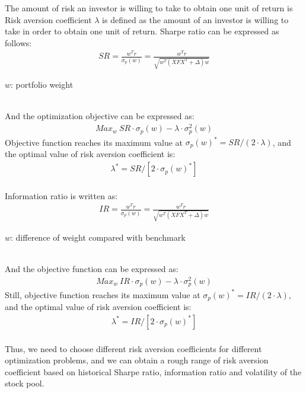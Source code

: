 \documentclass[10pt]{article}
\begin{document}
The amount of risk an investor is willing to take to obtain one unit of return is Risk aversion coefficient $\lambda$ is defined as the amount of an investor is willing to take in order to obtain one unit of return. Sharpe ratio can be expressed as follows:
~\\
\begin{equation}
\begin{split}
    SR=\frac{w^Tr}{\sigma_p(w)} =\frac{w^Tr}{\sqrt{w^T(XFX^T+\Delta)w}}
\end{split}
\end{equation}
\centerline{$w$: portfolio weight}
~\\
And the optimization objective can be expressed as:
\begin{equation}
\begin{split}
    Max_w\ SR\cdot \sigma_p(w)-\lambda\cdot\sigma^2_p(w)
\end{split}
\end{equation}
Objective function reaches its maximum value at $\sigma_p(w)^*=SR/(2\cdot\lambda)$, and the optimal value of risk aversion coefficient is:
~\\
\begin{equation}
\begin{split}
    \lambda^*=SR/[2\cdot\sigma_p(w)^*]
\end{split}
\end{equation}
~\\
Information ratio is written as:
~\\
\begin{equation}
\begin{split}
    IR=\frac{w^Tr}{\sigma_p(w)} =\frac{w^Tr}{\sqrt{w^T(XFX^T+\Delta)w}}
\end{split}
\end{equation}
\centerline{$w$: difference of weight compared with benchmark}
~\\
And the objective function can be expressed as:
\begin{equation}
\begin{split}
    Max_w\ IR\cdot \sigma_p(w)-\lambda\cdot\sigma^2_p(w)
\end{split}
\end{equation}
Still, objective function reaches its maximum value at $\sigma_p(w)^*=IR/(2\cdot\lambda)$, and the optimal value of risk aversion coefficient is:
~\\
\begin{equation}
\begin{split}
    \lambda^*=IR/[2\cdot\sigma_p(w)^*]
\end{split}
\end{equation}
~\\
Thus, we need to choose different risk aversion coefficients for different optimization problems, and we can obtain a rough range of risk aversion coefficient based on historical Sharpe ratio, information ratio and volatility of the stock pool.
\end{document}
